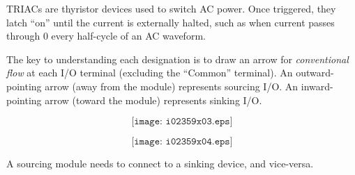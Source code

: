 TRIACs are thyristor devices used to switch AC power.  Once triggered, they latch ``on'' until the current is externally halted, such as when current passes through 0 every half-cycle of an AC waveform.

\vskip 10pt

The key to understanding each designation is to draw an arrow for {\it conventional flow} at each I/O terminal (excluding the ``Common'' terminal).  An outward-pointing arrow (away from the module) represents sourcing I/O.  An inward-pointing arrow (toward the module) represents sinking I/O.

$$\texttt{[image: i02359x03.eps]}$$

$$\texttt{[image: i02359x04.eps]}$$

\vskip 10pt

A sourcing module needs to connect to a sinking device, and vice-versa.





